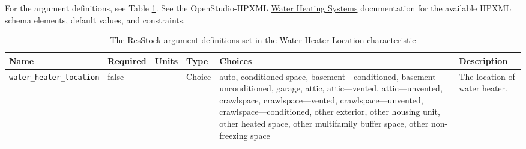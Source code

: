 For the argument definitions, see Table \ref{table:hc_arg_def_water_heater_loc}. See the OpenStudio-HPXML \href{https://openstudio-hpxml.readthedocs.io/en/v1.8.1/workflow_inputs.html#hpxml-water-heating-systems}{Water Heating Systems} documentation for the available HPXML schema elements, default values, and constraints.

\begin{longtable}[]{|p{3cm}|p{1.5cm}|p{1cm}|p{1.1cm}|p{3.9cm}|p{3.5cm}|} \caption{The ResStock argument definitions set in the Water Heater Location characteristic} \label{table:hc_arg_def_water_heater_loc}  \\
\toprule\noalign{}
Name & Required & Units & Type & Choices & Description \\
\midrule\noalign{}
\endhead
\bottomrule\noalign{}
\endlastfoot
\texttt{water\_heater\_location} & false & & Choice & auto, conditioned
space, basement---conditioned, basement---unconditioned, garage, attic,
attic---vented, attic---unvented, crawlspace, crawlspace---vented,
crawlspace---unvented, crawlspace---conditioned, other exterior, other
housing unit, other heated space, other multifamily buffer space, other
non-freezing space & The location of water heater. \\
\end{longtable}

